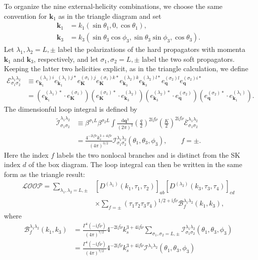 \documentclass[a4paper,12pt]{article}
\def\di{{\mathrm{d}}}
\def\mb{\mathbf}
\def\ii{\mathrm{i}}
\def\be{\beta}
\def\si{\sigma}
\def\tn{\tilde\nu}
\begin{document}
To organize the nine external-helicity combinations, we choose the same convention for $\mb k_1$ as in
the triangle diagram and set
\begin{align}
    \mb k_1&=k_1(\sin\theta_1,0,\cos\theta_1), \\
    \mb k_3&=k_3(\sin\theta_3\cos\phi_3,\sin\theta_3\sin\phi_3,\cos\theta_3).
\end{align}
Let $\lambda_1,\lambda_2=L,\pm$ label the polarizations of the hard propagators with momenta
$\mb k_1$ and $\mb k_3$, respectively, and let $\sigma_1,\sigma_2=L,\pm$ label the two soft propagators.
Keeping the latter two helicities explicit, as in the triangle calculation, we define
\begin{align}
    \mathcal{E}^{\lambda_1\lambda_2}_{\sigma_1\sigma_2}
    &\equiv
    e_{\mb k_1}^{(\lambda_1)i}e_{\mb k_1}^{(\lambda_1)j*}
    e_{\mb K}^{(\sigma_1)j}e_{\mb K}^{(\sigma_1)k*}
    e_{\mb k_3}^{(\lambda_2)k}e_{\mb k_3}^{(\lambda_2)l*}
    e_{\mb q}^{(\sigma_2)l}e_{\mb q}^{(\sigma_2)i*} \nonumber \\
    &=(e_{\mb k_1}^{(\lambda_1)*}\cdot e_{\mb K}^{(\sigma_1)})
    (e_{\mb K}^{(\sigma_1)*}\cdot e_{\mb k_3}^{(\lambda_2)})
    (e_{\mb k_3}^{(\lambda_2)*}\cdot e_{\mb q}^{(\sigma_2)})
    (e_{\mb q}^{(\sigma_2)*}\cdot e_{\mb k_1}^{(\lambda_1)}).
\end{align}
The dimensionful loop integral is defined by
\begin{align}
    \widetilde{\mathcal{I}}^{\lambda_1\lambda_2}_{\sigma_1\sigma_2}
    &\equiv \be^{\si_1L} \be^{\si_2L} \int\frac{\di\mb q^3}{(2\pi)^3}
    \left(\frac{q}{2}\right)^{2\ii f\tn}
    \left(\frac{K}{2}\right)^{2\ii f\tn}
    \overline{\mathcal{E}}^{\lambda_1\lambda_2}_{\sigma_1\sigma_2} \nonumber \\
    &=\frac{4^{-2\ii f\tn}k_s^{3+4\ii f\tn}}{(4\pi)^{3/2}}
    \mathcal{I}^{\lambda_1\lambda_2}_{\sigma_1\sigma_2}(\theta_1,\theta_3,\phi_3),
    \qquad f=\pm.
\end{align}
Here the index $f$ labels the two nonlocal branches and is distinct from the SK index $d$ of the box
diagram. The loop integral can then be written in the same form as the triangle result:
\begin{align}
    \mathcal{LOOP}
    =\sum_{\lambda_1,\lambda_2=L,\pm}
    &\left[D^{(\lambda_1)}(k_1,\tau_1,\tau_2)\right]_{ab}
    \left[D^{(\lambda_2)}(k_3,\tau_3,\tau_4)\right]_{cd} \nonumber \\
    &\times\sum_{f=\pm}(\tau_1\tau_2\tau_3\tau_4)^{1/2+\ii f\tn}
    \mathcal{B}^{\lambda_1\lambda_2}_f(k_1,k_3),
\end{align}
where
\begin{align}
    \mathcal{B}^{\lambda_1\lambda_2}_f(k_1,k_3)
    &= \frac{\Gamma^4(-\ii f\tn)}{(4\pi)^{7/2}}
    4^{-2\ii f\tn}k_s^{3+4\ii f\tn}
    \sum_{\sigma_1,\sigma_2=L,\pm}
    \mathcal{I}^{\lambda_1\lambda_2}_{\sigma_1\sigma_2}(\theta_1,\theta_3,\phi_3) \nonumber \\
    &= \frac{\Gamma^4(-\ii f\tn)}{(4\pi)^{7/2}}
    4^{-2\ii f\tn}k_s^{3+4\ii f\tn}
    \mathcal{I}^{\lambda_1\lambda_2}(\theta_1,\theta_3,\phi_3)
\end{align}
\end{document}
